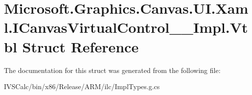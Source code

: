 \hypertarget{struct_microsoft_1_1_graphics_1_1_canvas_1_1_u_i_1_1_xaml_1_1_i_canvas_virtual_control_____impl_1_1_vtbl}{}\section{Microsoft.\+Graphics.\+Canvas.\+U\+I.\+Xaml.\+I\+Canvas\+Virtual\+Control\+\_\+\+\_\+\+Impl.\+Vtbl Struct Reference}
\label{struct_microsoft_1_1_graphics_1_1_canvas_1_1_u_i_1_1_xaml_1_1_i_canvas_virtual_control_____impl_1_1_vtbl}


The documentation for this struct was generated from the following file\+:\begin{DoxyCompactItemize}
\item 
I\+V\+S\+Calc/bin/x86/\+Release/\+A\+R\+M/ilc/Impl\+Types.\+g.\+cs\end{DoxyCompactItemize}
